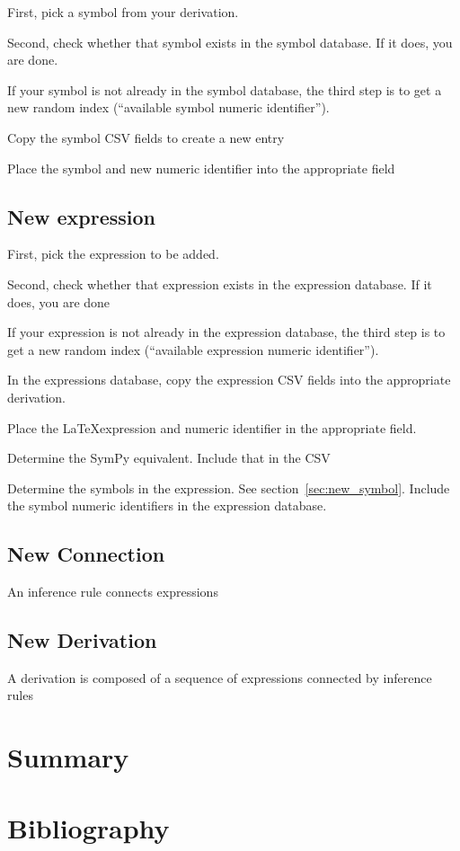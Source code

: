 \documentclass{article}
\begin{document}
\begin{multicols}{2}
First, pick a symbol from your derivation.

Second, check whether that symbol exists in the symbol database. If it does, you are done.

If your symbol is not already in the symbol database, the third step is to get a new  random index (``available symbol numeric identifier''). 

Copy the symbol CSV fields to create a new entry

Place the symbol and new numeric identifier into the appropriate field

\subsection{New expression\label{sec:new_expression}}

First, pick the expression to be added.

Second, check whether that expression exists in the expression database. If it does, you are done

If your expression is not already in the expression database, the third step is to get a new random index (``available expression numeric identifier''). 

In the expressions database, copy the expression CSV fields into the appropriate derivation. 

Place the \LaTeX expression and numeric identifier in the appropriate field. 

Determine the SymPy equivalent. Include that in the CSV

Determine the symbols in the expression. See section~\ref{sec:new_symbol}. Include the symbol numeric identifiers in the expression database.

\subsection{New Connection\label{sec:new_connection}}

An inference rule connects expressions

\subsection{New Derivation\label{sec:how_derivation}}

A derivation is composed of a sequence of expressions connected by inference rules

\section{Summary}

\section{Bibliography}


\end{multicols}

\newpage
\appendix
%
\end{document}
